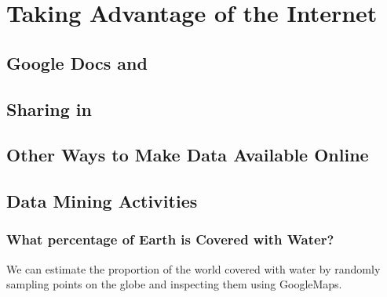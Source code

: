 \chapter{Taking Advantage of the Internet}




\section{Google Docs and \RStudio}

\section{Sharing in \RStudio}

\section{Other Ways to Make Data Available Online}

\section{Data Mining Activities}
\subsection{What percentage of Earth is Covered with Water?}
We can estimate the proportion of the world covered with water by randomly 
sampling points on the globe and inspecting them using GoogleMaps.

